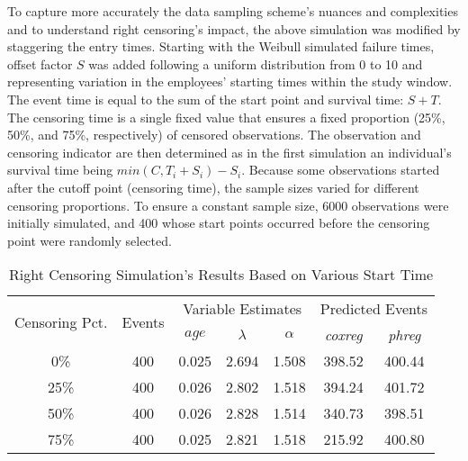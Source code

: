 To capture more accurately the data sampling scheme's nuances and complexities and to understand right censoring's impact, the above simulation was modified by staggering the entry times. Starting with the Weibull simulated failure times, offset factor $S$ was added following a uniform distribution from 0 to 10 and representing variation in the employees' starting times within the study window. The event time is equal to the sum of the start point and survival time: $S+T$. The censoring time is a single fixed value that ensures a fixed proportion (25\%, 50\%, and 75\%, respectively) of censored observations.  The observation and censoring indicator are then determined as in the first simulation an individual's survival time being $min(C,T_i+S_i) - S_i$. Because some observations started after the cutoff point (censoring time), the sample sizes varied for different censoring proportions. To ensure a constant sample size, 6000 observations were initially simulated, and 400 whose start points occurred before the censoring point were randomly selected.
\begin{table}[htbp]
	\scriptsize %
	\centering
	\caption{Right Censoring Simulation's Results Based on Various Start Time}
	\begin{tabular}{ccccccc}
		\toprule
		\multicolumn{1}{c}{\multirow{2}{1.5cm}{Censoring Pct.}}  & \multirow{2}[4]{*}{Events} & \multicolumn{3}{c}{Variable Estimates} & \multicolumn{2}{c}{Predicted Events} \\ \cline{3-7}
		&       & $age$   & $\lambda$ & $\alpha$ &\it{coxreg} & \it{phreg}\\
		\midrule
		0\%   & 400   & 0.025 & 2.694 & 1.508 & 398.52 & 400.44 \\
		25\%  & 400   & 0.026 & 2.802 & 1.518 & 394.24 & 401.72 \\
		50\%  & 400   & 0.026 & 2.828 & 1.514 & 340.73 & 398.51 \\
		75\%  & 400   & 0.025 & 2.821 & 1.518 & 215.92 & 400.80 \\
		\bottomrule
	\end{tabular}%
	\label{tab:right2}%
\end{table}%


